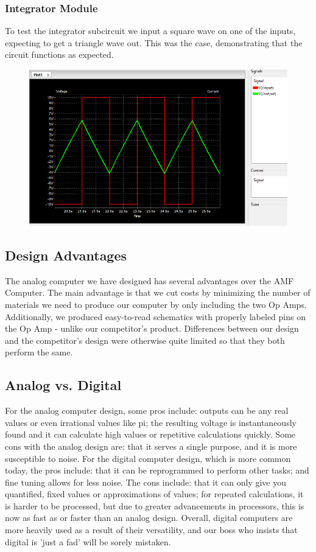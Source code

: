 \documentclass[11pt]{article}
\begin{document}
	\subsubsection*{Integrator Module}
	To test the integrator subcircuit we input a square wave on one of the inputs, expecting to get a triangle wave out. This was the case, demonstrating that the circuit functions as expected.
	\begin{figure}[H]
		\centering
		\includegraphics[width=7in]{images/simulation_integration.png}
	\end{figure}
	
	\subsection*{Design Advantages}	
	The analog computer we have designed has several advantages over the AMF Computer. The main advantage is that we cut costs by minimizing the number of materials we need to produce our computer by only including the two Op Amps. Additionally, we produced easy-to-read schematics with properly labeled pins on the Op Amp - unlike our competitor's product. Differences between our design and the competitor's design were otherwise quite limited so that they both perform the same.
	
	\subsection *{Analog vs. Digital}
	For the analog computer design, some pros include: outputs can be any real values or even irrational values like pi; the resulting voltage is instantaneously found and it can calculate high values or repetitive calculations quickly. Some cons with the analog design are: that it serves a single purpose, and it is more susceptible to noise. 
	For the digital computer design, which is more common today, the pros include: that it can be reprogrammed to perform other tasks; and fine tuning allows for less noise. The cons include: that it can only give you quantified, fixed values or approximations of values; for repeated calculations, it is harder to be processed, but due to greater advancements in processors, this is now as fast as or faster than an analog design. Overall, digital computers are more heavily used as a result of their versatility, and our boss who insists that digital is 'just a fad' will be sorely mistaken.  
	
\end{document}
